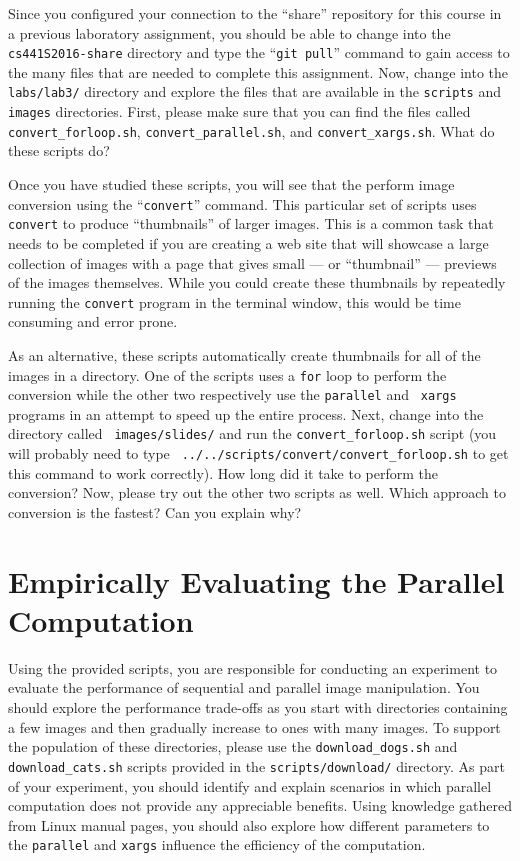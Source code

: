 Since you configured your connection to the ``share'' repository for this course in a previous laboratory assignment,
you should be able to change into the {\tt cs441S2016-share} directory and type the ``{\tt git pull}'' command to gain
access to the many files that are needed to complete this assignment. Now, change into the {\tt labs/lab3/} directory
and explore the files that are available in the {\tt scripts} and {\tt images} directories. First, please make sure that
you can find the files called {\tt convert\_forloop.sh}, {\tt convert\_parallel.sh}, and {\tt convert\_xargs.sh}. What
do these scripts do?

Once you have studied these scripts, you will see that the perform image conversion using the ``{\tt convert}'' command.
This particular set of scripts uses {\tt convert} to produce ``thumbnails'' of larger images. This is a common task that
needs to be completed if you are creating a web site that will showcase a large collection of images with a page that
gives small --- or ``thumbnail'' --- previews of the images themselves. While you could create these thumbnails by
repeatedly running the {\tt convert} program in the terminal window, this would be time consuming and error prone.

As an alternative, these scripts automatically create thumbnails for all of the images in a directory. One of the
scripts uses a {\tt for} loop to perform the conversion while the other two respectively use the {\tt parallel} and {\tt
  xargs} programs in an attempt to speed up the entire process. Next, change into the directory called {\tt
  images/slides/} and run the {\tt convert\_forloop.sh} script (you will probably need to type {\tt
../../scripts/convert/convert\_forloop.sh} to get this command to work correctly). How long did it take to perform the
conversion? Now, please try out the other two scripts as well. Which approach to conversion is the fastest? Can you
explain why?

\section*{Empirically Evaluating the Parallel Computation}

Using the provided scripts, you are responsible for conducting an experiment to evaluate the performance of sequential
and parallel image manipulation. You should explore the performance trade-offs as you start with directories containing
a few images and then gradually increase to ones with many images. To support the population of these directories,
please use the {\tt download\_dogs.sh} and {\tt download\_cats.sh} scripts provided in the {\tt scripts/download/}
directory. As part of your experiment, you should identify and explain scenarios in which parallel computation does not
provide any appreciable benefits. Using knowledge gathered from Linux manual pages, you should also explore how
different parameters to the {\tt parallel} and {\tt xargs} influence the efficiency of the computation.

